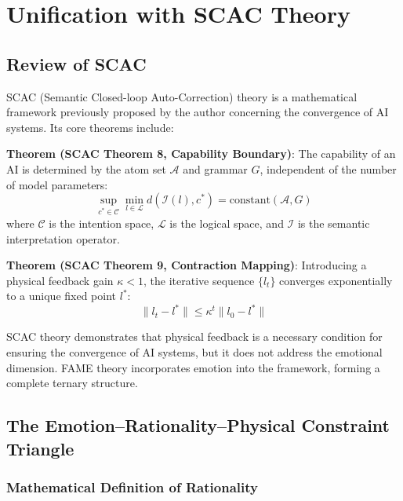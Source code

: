 \documentclass[12pt,a4paper]{article}
\theoremstyle{plain}
\begin{document}
\section{Unification with SCAC Theory}

\subsection{Review of SCAC}

SCAC (Semantic Closed-loop Auto-Correction) theory is a mathematical framework previously proposed by the author concerning the convergence of AI systems. Its core theorems include:

\textbf{Theorem (SCAC Theorem 8, Capability Boundary)}: The capability of an AI is determined by the atom set $\mathcal{A}$ and grammar $G$, independent of the number of model parameters:
\begin{equation}
\sup_{c^* \in \mathcal{C}} \min_{l \in \mathcal{L}} d(\mathcal{I}(l), c^*) = \text{constant}(\mathcal{A}, G)
\label{eq:scac8}
\end{equation}
where $\mathcal{C}$ is the intention space, $\mathcal{L}$ is the logical space, and $\mathcal{I}$ is the semantic interpretation operator.

\textbf{Theorem (SCAC Theorem 9, Contraction Mapping)}: Introducing a physical feedback gain $\kappa < 1$, the iterative sequence $\{l_t\}$ converges exponentially to a unique fixed point $l^*$:
\begin{equation}
\|l_t - l^*\| \leq \kappa^t \|l_0 - l^*\|
\label{eq:scac9}
\end{equation}

SCAC theory demonstrates that physical feedback is a necessary condition for ensuring the convergence of AI systems, but it does not address the emotional dimension. FAME theory incorporates emotion into the framework, forming a complete ternary structure.

\subsection{The Emotion–Rationality–Physical Constraint Triangle}

\subsubsection{Mathematical Definition of Rationality}
\end{document}
